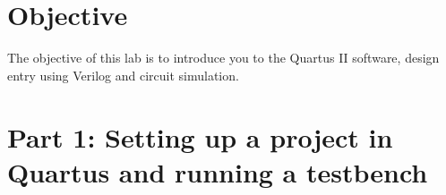 \documentclass[
]{article}
\author{}
\date{}
\begin{document}
\hypertarget{objective}{%
\section{\texorpdfstring{Objective }{Objective }}\label{objective}}

The objective of this lab is to introduce you to the Quartus II
software, design entry using Verilog and circuit simulation.

\hypertarget{section}{%
\section{}\label{section}}

\hypertarget{part-1-setting-up-a-project-in-quartus-and-running-a-testbench}{%
\section{\texorpdfstring{ Part 1: Setting up a project in Quartus and
running a
testbench}{ Part 1: Setting up a project in Quartus and running a testbench}}\label{part-1-setting-up-a-project-in-quartus-and-running-a-testbench}}
\end{document}
